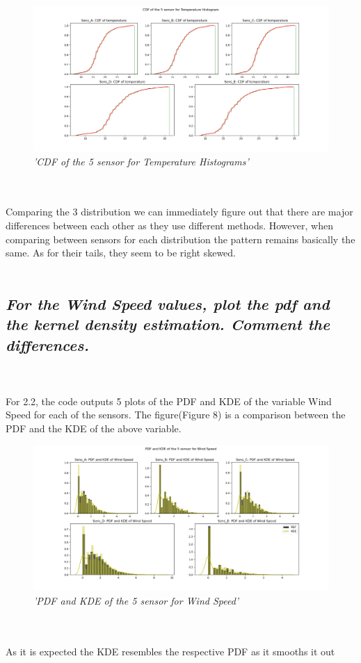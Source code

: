 \documentclass[a4paper,12pt]{article} %
\begin{document}
\\\\
\begin{figure}[H]
\centering
\includegraphics[width=\textwidth]{Graphs/CDF_of_the_5_sensor_-_Temperature_Histogram.png}
\caption{\it'CDF of the 5 sensor for Temperature Histograms'}
\end{figure}
\\\\
Comparing the 3 distribution we can immediately figure out that there are major 
differences between each other as they use different methods. However, when comparing between sensors for each distribution the pattern remains basically the same. As for their tails, they seem to be right skewed.
\\\\
\subsection{\it For the Wind Speed values, plot the pdf and the kernel density estimation. Comment the differences.}
\\\\
For 2.2, the code outputs 5 plots of the PDF and KDE 
of the variable Wind Speed for each of the sensors. The figure(Figure 8) is a 
comparison between the PDF and the KDE of the above variable.
\\ 
\begin{figure}[H]
\centering
\includegraphics[width=\textwidth]{Graphs/PDF_and_KDE_of_the_5_sensor_-_Wind_Speed.png}
\caption{\it'PDF and KDE of the 5 sensor for Wind Speed'}
\end{figure}
\\\\
As it is expected the KDE resembles the respective PDF as it smooths it out 
\\\\
\end{document}
